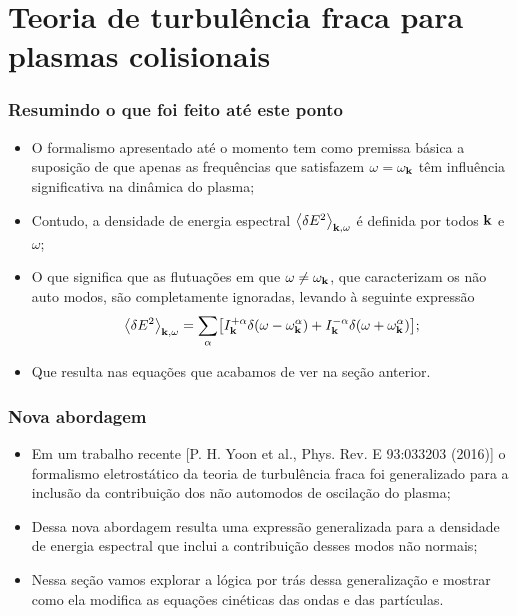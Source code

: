 \documentclass[10pt,aspectratio=1610,lualatex]{beamer}
\begin{document}
\section{Teoria de turbulência fraca para plasmas colisionais}
\begin{frame}
  \frametitle{Resumindo o que foi feito até este ponto}
  \begin{itemize}
    \item O formalismo apresentado até o momento tem como premissa
    básica a suposição de que apenas as frequências que satisfazem
    $\omega=\omega_{\bf k}$ têm influência significativa na dinâmica
    do plasma;
    \vspace{0.5cm}
    \pause
    \item Contudo, a densidade de energia espectral
    $\left<\delta E^2\right>_{{\bf k},\omega}$ é definida por todos
    ${\bf k}$ e $\omega$;
    \vspace{0.55cm}
    \pause
    \item O que significa que as flutuações em que
    $\omega \ne \omega_{\bf k}$, que caracterizam os não auto modos,
    são completamente ignoradas, levando à seguinte expressão
    \begin{equation*}
      \left<\delta E^2\right>_{{\bf k},\omega}
      =\sum_{\alpha}\bigl[I^{+\alpha}_{\bf k}
      \delta(\omega-\omega_{\bf k}^{\alpha})
      +I^{-\alpha}_{\bf k} \delta(\omega+\omega_{\bf k}^{\alpha})\bigr];
    \end{equation*}
    \pause
    \item Que resulta nas equações que acabamos de ver na seção
    anterior.
  \end{itemize}
\end{frame}

\begin{frame}
  \frametitle{Nova abordagem}
  \begin{itemize}
    \item Em um trabalho recente [P. H. Yoon et al., Phys. Rev.
    E 93:033203 (2016)] o formalismo eletrostático da teoria
    de turbulência fraca foi generalizado para a inclusão da
    contribuição dos não automodos de oscilação do plasma;
    \vspace{0.5cm}
    \pause
    \item Dessa nova abordagem resulta uma expressão generalizada
    para a densidade de energia espectral que inclui a contribuição
    desses modos não normais;
    \vspace{0.5cm}
    \pause
    \item Nessa seção vamos explorar a lógica por trás dessa
    generalização e mostrar como ela modifica as equações
    cinéticas das ondas e das partículas.
  \end{itemize}
\end{frame}
\end{document}
